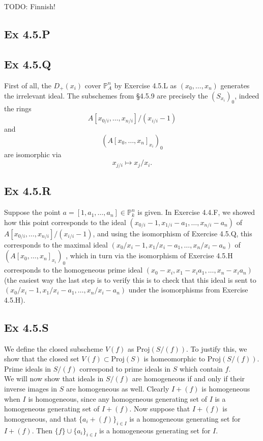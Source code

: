 \documentclass{article}
\theoremstyle{definition}
\renewcommand{\P}{\mathbb{P}}
\newcommand{\Proj}{\text{Proj}}
\begin{document}
TODO: Finnish!

\subsection*{Ex 4.5.P}

\subsection*{Ex 4.5.Q}

First of all, the $D_{+}(x_i)$ cover $\P^{n}_A$ by Exercise 4.5.L as $(x_0,
\ldots, x_n)$ generates the irrelevant ideal. The subschemes from §4.5.9 are 
precisely the $(S_{x_i})_{0}$, indeed the rings 
\[
	A[x_{0/i}, \ldots, x_{n/i}]/(x_{i/i} - 1)
\] 
and 
\[
	(A[x_0, \ldots, x_n]_{x_i})_{0}
\] 
are isomorphic via 
\[
	x_{j/i} \mapsto x_{j}/x_{i}.
\] 

\subsection*{Ex 4.5.R}

Suppose the point $a = [1, a_1, \ldots, a_n] \in \P^{n}_{k}$ is given. In
Exercise 4.4.F, we showed how this point corresponds to the ideal $(x_{0/i} -
1, x_{1/i} - a_1, \ldots, x_{n/i} - a_n)$ of $A[x_{0/i}, \ldots,
x_{n/i}]/(x_{i/i} - 1)$, and using the isomorphism of Exercise 4.5.Q, this
corresponds to the maximal ideal $(x_0/x_i - 1, x_1/x_i - a_1, \ldots, x_n/x_i
- a_n)$ of $(A[x_0, \ldots, x_n]_{x_i})_{0}$, which in turn via the isomorphism
of Exercise 4.5.H corresponds to the homogeneous prime ideal $(x_0 - x_i, x_1 -
x_i a_1, \ldots, x_n - x_i a_n)$ (the easiest way the last step is to verify
this is to check that this ideal is sent to $(x_0/x_i - 1, x_1/x_i - a_1,
\ldots, x_n/x_i - a_n)$ under the isomorphisms from Exercise 4.5.H).

\subsection*{Ex 4.5.S}

We define the closed subscheme $V(f)$ as $\Proj(S/(f))$. To justify this, we show
that the closed set $V(f) \subset \Proj(S)$ is homeomorphic to $\Proj(S/(f))$. \\

Prime ideals in $S/(f)$ correspond to prime ideals in $S$ which contain $f$. \\

We will now show that ideals in $S/(f)$ are homogeneous if and only if their
inverse images in $S$ are homogeneous as well. Clearly $I + (f)$ is homogeneous
when $I$ is homogeneous, since any homogeneous generating set of $I$ is a
homogeneous generating set of $I + (f)$. Now suppose that $I + (f)$ is
homogeneous, and that $\{a_i + (f)\}_{i \in I}$ is a homogeneous generating set
for $I + (f)$. Then $\{f\} \cup \{a_i\}_{i \in I}$ is a homogeneous generating
set for $I$. \\
\end{document}

